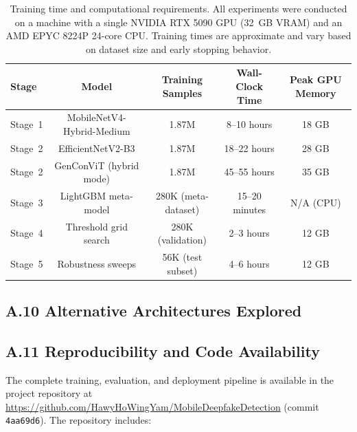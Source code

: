 \begin{table}[h]
  \centering
  \caption{Training time and computational requirements. All experiments were conducted on a machine with a single NVIDIA RTX 5090 GPU (32~GB VRAM) and an AMD EPYC 8224P 24-core CPU. Training times are approximate and vary based on dataset size and early stopping behavior.}
  \label{tab:training_time_appendix}
  {\small
  \begin{tabular}{@{}lcccc@{}}
    \toprule
    Stage & Model & Training Samples & Wall-Clock Time & Peak GPU Memory \\
    \midrule
    Stage~1 & MobileNetV4-Hybrid-Medium & 1.87M & 8--10 hours & 18 GB \\
    Stage~2 & EfficientNetV2-B3 & 1.87M & 18--22 hours & 28 GB \\
    Stage~2 & GenConViT (hybrid mode) & 1.87M & 45--55 hours & 35 GB \\
    Stage~3 & LightGBM meta-model & 280K (meta-dataset) & 15--20 minutes & N/A (CPU) \\
    \midrule
    Stage~4 & Threshold grid search & 280K (validation) & 2--3 hours & 12 GB \\
    Stage~5 & Robustness sweeps & 56K (test subset) & 4--6 hours & 12 GB \\
    \bottomrule
  \end{tabular}}
\end{table}

\subsection*{A.10 Alternative Architectures Explored}



\subsection*{A.11 Reproducibility and Code Availability}

The complete training, evaluation, and deployment pipeline is available in the project repository at \url{https://github.com/HawyHoWingYam/MobileDeepfakeDetection} (commit \texttt{4aa69d6}). The repository includes:

